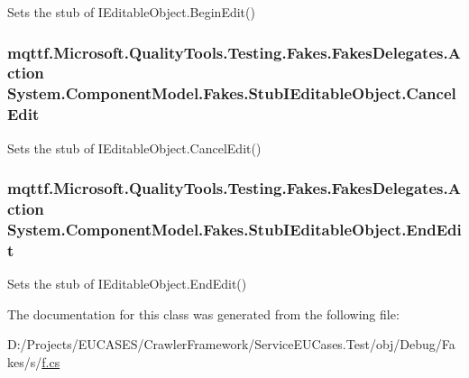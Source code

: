 Sets the stub of I\-Editable\-Object.\-Begin\-Edit()

\hypertarget{class_system_1_1_component_model_1_1_fakes_1_1_stub_i_editable_object_a599dabcd620199b2e6d76cfbde88e04a}{
\subsubsection[{Cancel\-Edit}]{\setlength{\rightskip}{0pt plus 5cm}mqttf.\-Microsoft.\-Quality\-Tools.\-Testing.\-Fakes.\-Fakes\-Delegates.\-Action System.\-Component\-Model.\-Fakes.\-Stub\-I\-Editable\-Object.\-Cancel\-Edit}}\label{class_system_1_1_component_model_1_1_fakes_1_1_stub_i_editable_object_a599dabcd620199b2e6d76cfbde88e04a}


Sets the stub of I\-Editable\-Object.\-Cancel\-Edit()

\hypertarget{class_system_1_1_component_model_1_1_fakes_1_1_stub_i_editable_object_a56df9035c7ac947bdc343ec3a8f10ac5}{
\subsubsection[{End\-Edit}]{\setlength{\rightskip}{0pt plus 5cm}mqttf.\-Microsoft.\-Quality\-Tools.\-Testing.\-Fakes.\-Fakes\-Delegates.\-Action System.\-Component\-Model.\-Fakes.\-Stub\-I\-Editable\-Object.\-End\-Edit}}\label{class_system_1_1_component_model_1_1_fakes_1_1_stub_i_editable_object_a56df9035c7ac947bdc343ec3a8f10ac5}


Sets the stub of I\-Editable\-Object.\-End\-Edit()



The documentation for this class was generated from the following file\-:\begin{DoxyCompactItemize}
\item 
D\-:/\-Projects/\-E\-U\-C\-A\-S\-E\-S/\-Crawler\-Framework/\-Service\-E\-U\-Cases.\-Test/obj/\-Debug/\-Fakes/s/\hyperlink{s_2f_8cs}{f.\-cs}\end{DoxyCompactItemize}

